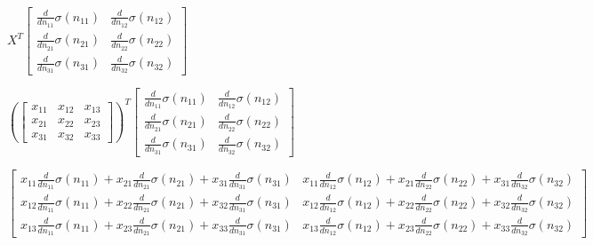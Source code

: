 \documentclass[11pt]{article}
\begin{document}
    $\displaystyle X^{T} \left[\begin{matrix}\frac{d}{d n_{11}} \sigma{\left(n_{11} \right)} & \frac{d}{d n_{12}} \sigma{\left(n_{12} \right)}\\\frac{d}{d n_{21}} \sigma{\left(n_{21} \right)} & \frac{d}{d n_{22}} \sigma{\left(n_{22} \right)}\\\frac{d}{d n_{31}} \sigma{\left(n_{31} \right)} & \frac{d}{d n_{32}} \sigma{\left(n_{32} \right)}\end{matrix}\right]$

    
    $\displaystyle \left(\left[\begin{matrix}x_{11} & x_{12} & x_{13}\\x_{21} & x_{22} & x_{23}\\x_{31} & x_{32} & x_{33}\end{matrix}\right]\right)^{T} \left[\begin{matrix}\frac{d}{d n_{11}} \sigma{\left(n_{11} \right)} & \frac{d}{d n_{12}} \sigma{\left(n_{12} \right)}\\\frac{d}{d n_{21}} \sigma{\left(n_{21} \right)} & \frac{d}{d n_{22}} \sigma{\left(n_{22} \right)}\\\frac{d}{d n_{31}} \sigma{\left(n_{31} \right)} & \frac{d}{d n_{32}} \sigma{\left(n_{32} \right)}\end{matrix}\right]$

    
    $\displaystyle \left[\begin{matrix}x_{11} \frac{d}{d n_{11}} \sigma{\left(n_{11} \right)} + x_{21} \frac{d}{d n_{21}} \sigma{\left(n_{21} \right)} + x_{31} \frac{d}{d n_{31}} \sigma{\left(n_{31} \right)} & x_{11} \frac{d}{d n_{12}} \sigma{\left(n_{12} \right)} + x_{21} \frac{d}{d n_{22}} \sigma{\left(n_{22} \right)} + x_{31} \frac{d}{d n_{32}} \sigma{\left(n_{32} \right)}\\x_{12} \frac{d}{d n_{11}} \sigma{\left(n_{11} \right)} + x_{22} \frac{d}{d n_{21}} \sigma{\left(n_{21} \right)} + x_{32} \frac{d}{d n_{31}} \sigma{\left(n_{31} \right)} & x_{12} \frac{d}{d n_{12}} \sigma{\left(n_{12} \right)} + x_{22} \frac{d}{d n_{22}} \sigma{\left(n_{22} \right)} + x_{32} \frac{d}{d n_{32}} \sigma{\left(n_{32} \right)}\\x_{13} \frac{d}{d n_{11}} \sigma{\left(n_{11} \right)} + x_{23} \frac{d}{d n_{21}} \sigma{\left(n_{21} \right)} + x_{33} \frac{d}{d n_{31}} \sigma{\left(n_{31} \right)} & x_{13} \frac{d}{d n_{12}} \sigma{\left(n_{12} \right)} + x_{23} \frac{d}{d n_{22}} \sigma{\left(n_{22} \right)} + x_{33} \frac{d}{d n_{32}} \sigma{\left(n_{32} \right)}\end{matrix}\right]$
\end{document}
